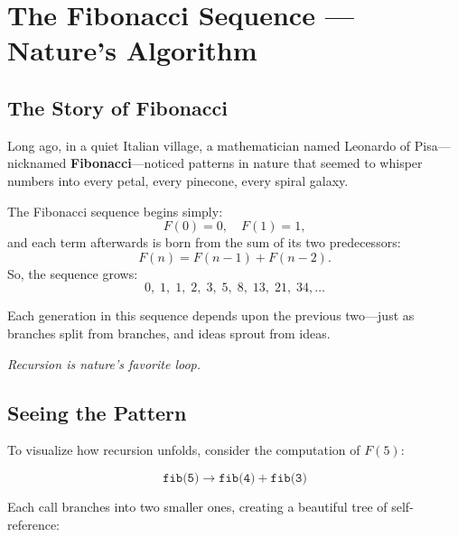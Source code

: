 \chapter{The Fibonacci Sequence — Nature’s Algorithm}

\section{The Story of Fibonacci}
Long ago, in a quiet Italian village, a mathematician named Leonardo of Pisa—nicknamed \textbf{Fibonacci}—noticed patterns in nature that seemed to whisper numbers into every petal, every pinecone, every spiral galaxy.

The Fibonacci sequence begins simply:
\[
F(0) = 0, \quad F(1) = 1,
\]
and each term afterwards is born from the sum of its two predecessors:
\[
F(n) = F(n-1) + F(n-2).
\]
So, the sequence grows:
\[
0, \; 1, \; 1, \; 2, \; 3, \; 5, \; 8, \; 13, \; 21, \; 34, \ldots
\]

Each generation in this sequence depends upon the previous two—just as branches split from branches, and ideas sprout from ideas.

\vspace{1em}
\begin{center}
\textit{Recursion is nature’s favorite loop.}
\end{center}
\vspace{1em}

\section{Seeing the Pattern}
To visualize how recursion unfolds, consider the computation of $F(5)$:

\[
\texttt{fib(5)} \rightarrow \texttt{fib(4)} + \texttt{fib(3)}
\]

Each call branches into two smaller ones, creating a beautiful tree of self-reference:

\begin{center}
\end{center}

